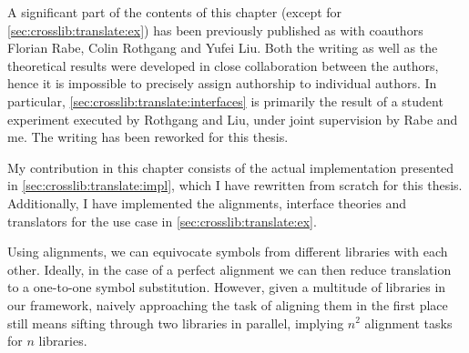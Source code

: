 \begin{disclaimer*}
	A significant part of the contents of this chapter (except for \autoref{sec:crosslib:translate:ex})  has been previously published as \cite{MRLR:alignments:17} with coauthors Florian Rabe, Colin Rothgang and Yufei Liu. Both the writing as well as the theoretical results were developed in close collaboration between the authors, hence it is impossible to precisely assign authorship to individual authors. In particular, \autoref{sec:crosslib:translate:interfaces} is primarily the result of a student experiment executed by Rothgang and Liu, under joint supervision by Rabe and me. The writing has been reworked for this thesis.
	
	My contribution in this chapter consists of the actual implementation presented in \autoref{sec:crosslib:translate:impl}, which I have rewritten from scratch for this thesis. Additionally, I have implemented the alignments, interface theories and translators for the use case in \autoref{sec:crosslib:translate:ex}.
\end{disclaimer*}

Using alignments, we can equivocate symbols from different libraries with each other. Ideally, in the case of a perfect alignment we can then reduce translation to a one-to-one symbol substitution. However, given a multitude of libraries in our framework, naively approaching the task of aligning them in the first place still means sifting through two libraries in parallel, implying $n^2$ alignment tasks for $n$ libraries.

%

